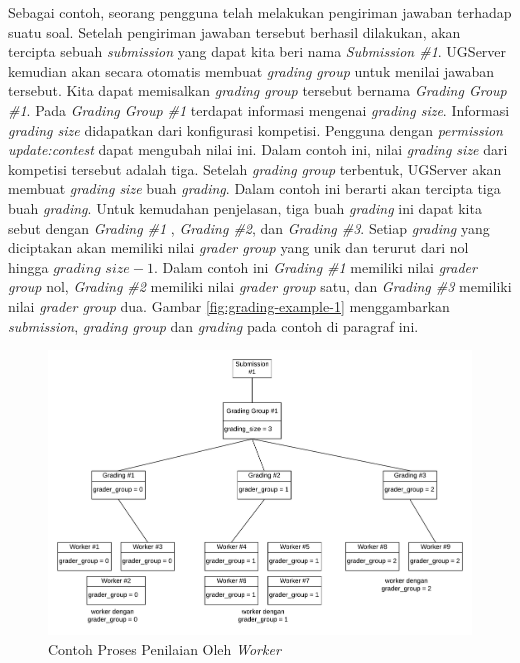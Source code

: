 \par Sebagai contoh, seorang pengguna telah melakukan pengiriman jawaban terhadap suatu soal. Setelah pengiriman jawaban tersebut berhasil dilakukan, akan tercipta sebuah \textit{submission} yang dapat kita beri nama \textit{Submission \#1}. UGServer kemudian akan secara otomatis membuat \textit{grading group} untuk menilai jawaban tersebut. Kita dapat memisalkan \textit{grading group} tersebut bernama \textit{Grading Group \#1}. Pada \textit{Grading Group \#1} terdapat informasi mengenai \textit{grading size}. Informasi \textit{grading size} didapatkan dari konfigurasi kompetisi. Pengguna dengan \textit{permission update:contest} dapat mengubah nilai ini. Dalam contoh ini, nilai \textit{grading size} dari kompetisi tersebut adalah tiga. Setelah \textit{grading group} terbentuk, UGServer akan membuat \textit{grading size} buah \textit{grading}. Dalam contoh ini berarti akan tercipta tiga buah \textit{grading}. Untuk kemudahan penjelasan, tiga buah \textit{grading} ini dapat kita sebut dengan \textit{Grading \#1} , \textit{Grading \#2}, dan \textit{Grading \#3}. Setiap \textit{grading} yang diciptakan akan memiliki nilai \textit{grader group} yang unik dan terurut dari nol hingga $\textit{grading size} - 1$. Dalam contoh ini \textit{Grading \#1} memiliki nilai \textit{grader group} nol, \textit{Grading \#2} memiliki nilai \textit{grader group} satu, dan \textit{Grading \#3} memiliki nilai \textit{grader group} dua. Gambar \ref{fig:grading-example-1} menggambarkan \textit{submission}, \textit{grading group} dan \textit{grading} pada contoh di paragraf ini.

\begin{figure}[ht!]
    \centering
    \includegraphics[width=\textwidth]{images/grading-example-2}
    \caption{Contoh Proses Penilaian Oleh \textit{Worker}}
    \label{fig:grading-example-2}
\end{figure}

